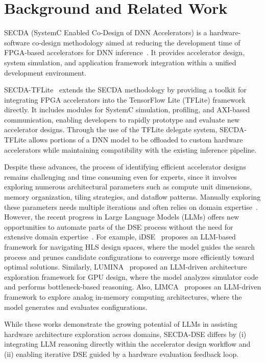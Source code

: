 
\section{Background and Related Work}
\label{background}

SECDA (SystemC Enabled Co-Design of DNN Accelerators) is a hardware-software co-design methodology aimed at reducing the development time of FPGA-based accelerators for DNN inference~\cite{haris2021secda}. It provides accelerator design, system simulation, and application framework integration within a unified development environment. 

SECDA-TFLite~\cite{haris2023secda} extends the SECDA methodology by providing a toolkit for integrating FPGA accelerators into the TensorFlow Lite (TFLite) framework directly. It includes modules for SystemC simulation, profiling, and AXI-based communication, enabling developers to rapidly prototype and evaluate new accelerator designs. Through the use of the TFLite delegate system, SECDA-TFLite allows portions of a DNN model to be offloaded to custom hardware accelerators while maintaining compatibility with the existing inference pipeline. 

Despite these advances, the process of identifying efficient accelerator designs remains challenging and time consuming even for experts, since it involves exploring numerous architectural parameters such as compute unit dimensions, memory organization, tiling strategies, and dataflow patterns. Manually exploring these parameters needs multiple iterations and often relies on domain expertise~\cite{dhilleswararao2022efficient, boutros2025field}. 
However, the recent progress in Large Language Models (LLMs) offers new opportunities to automate parts of the DSE process without the need for extensive domain expertise~\cite{ling2025domain, zheng2025automation}. 
For example, iDSE~\cite{li2025idse} proposes an LLM-based framework for navigating HLS design spaces, where the model guides the search process and prunes candidate configurations to converge more efficiently toward optimal solutions. 
Similarly, LUMINA~\cite{zhang2026luminallmguidedgpuarchitecture} proposed an LLM-driven architecture exploration framework for GPU design, where the model analyzes simulator code and performs bottleneck-based reasoning. 
Also, LIMCA~\cite{vungarala2025limca} proposes an LLM-driven framework to explore analog in-memory computing architectures, where the model generates and evaluates configurations. 

While these works demonstrate the growing potential of LLMs in assisting hardware architecture exploration across domains, SECDA-DSE differs by (i) integrating LLM reasoning directly within the accelerator design workflow and (ii) enabling iterative DSE guided by a hardware evaluation feedback loop.